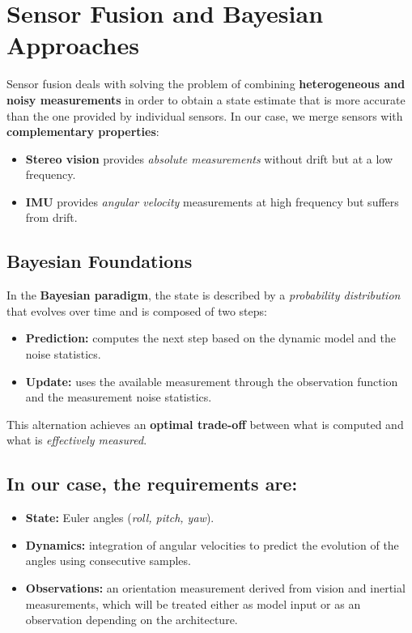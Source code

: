 \section{Sensor Fusion and Bayesian Approaches}

Sensor fusion deals with solving the problem of combining \textbf{heterogeneous and noisy measurements} in order to obtain a state estimate that is more accurate than the one provided by individual sensors.  
In our case, we merge sensors with \textbf{complementary properties}:  
\begin{itemize}
    \item \textbf{Stereo vision} provides \textit{absolute measurements} without drift but at a low frequency.  
    \item \textbf{IMU} provides \textit{angular velocity} measurements at high frequency but suffers from drift.  
\end{itemize}

\subsection*{Bayesian Foundations}
In the \textbf{Bayesian paradigm}, the state is described by a \textit{probability distribution} that evolves over time and is composed of two steps:  
\begin{itemize}
    \item \textbf{Prediction:} computes the next step based on the dynamic model and the noise statistics.  
    \item \textbf{Update:} uses the available measurement through the observation function and the measurement noise statistics.  
\end{itemize}

This alternation achieves an \textbf{optimal trade-off} between what is computed and what is \textit{effectively measured}.  

\subsection*{In our case, the requirements are:}
\begin{itemize}
    \item \textbf{State:} Euler angles (\textit{roll, pitch, yaw}).  
    \item \textbf{Dynamics:} integration of angular velocities to predict the evolution of the angles using consecutive samples.  
    \item \textbf{Observations:} an orientation measurement derived from vision and inertial measurements, which will be treated either as model input or as an observation depending on the architecture.  
\end{itemize}

